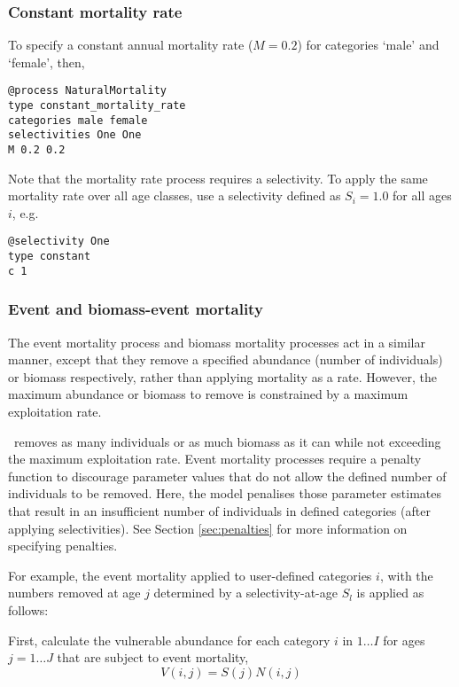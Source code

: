 \subsubsection*{Constant mortality rate}

To specify a constant annual mortality rate ($M=0.2$) for categories `male' and `female', then, 
{\small{\begin{verbatim}
@process NaturalMortality
type constant_mortality_rate
categories male female
selectivities One One
M 0.2 0.2
\end{verbatim}}}
Note that the mortality rate process requires a selectivity. To apply the same mortality rate over all age classes, use a selectivity defined as $S_i=1.0$ for all ages $i$, e.g.
{\small{\begin{verbatim}
@selectivity One
type constant
c 1
\end{verbatim}}}

\subsubsection*{Event and biomass-event mortality}

The event mortality process and biomass mortality processes act in a similar manner, except that they remove a specified abundance (number of individuals) or biomass respectively, rather than applying mortality as a rate. However, the maximum abundance or biomass to remove is constrained by a maximum exploitation rate.

 \iSAM\ removes as many individuals or as much biomass as it can while not exceeding the maximum exploitation rate. Event mortality processes require a penalty function to discourage parameter values that do not allow the defined number of individuals to be removed. Here, the model penalises those parameter estimates that result in an insufficient number of individuals in defined categories (after applying selectivities). See Section \ref{sec:penalties} for more information on specifying penalties.

For example, the event mortality applied to user-defined categories $i$, with the numbers removed at age $j$ determined by a selectivity-at-age $S_l$ is applied as follows:

First, calculate the vulnerable abundance for each category $i$ in $1 \ldots I$ for ages $j = 1 \ldots J$ that are subject to event mortality,
\begin{equation}
  V(i,j) = S(j) N(i,j)
\end{equation}

